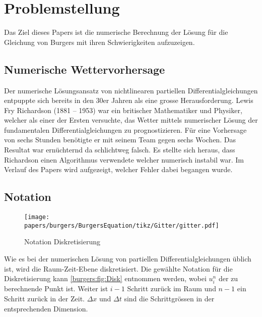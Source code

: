 %
%
\section{Problemstellung
\label{burgers:section:problemstellung}}

	Das Ziel dieses Papers ist die numerische Berechnung der Lösung für die Gleichung von Burgers mit ihren Schwierigkeiten aufzuzeigen.



	\subsection{Numerische Wettervorhersage}
	\label{burgers:sec:nwp}

	Der numerische L\"osungsansatz von nichtlinearen partiellen Differentialgleichungen entpuppte sich bereits in den 30er Jahren als eine grosse Herausforderung.
	Lewis Fry Richardson (1881 -- 1953) war ein britischer Mathematiker und Physiker, welcher als einer der Ersten versuchte, das Wetter mittels numerischer Lösung der fundamentalen Differentialgleichungen zu prognostizieren.
%
	F\"ur eine Vorhersage von sechs Stunden ben\"otigte er mit seinem Team gegen sechs Wochen.
%
	Das Resultat war ern\"uchternd da schlichtweg falsch.
	Es stellte sich heraus, dass Richardson einen Algorithmus verwendete welcher numerisch instabil war.
	Im Verlauf des Papers wird aufgezeigt, welcher Fehler dabei begangen wurde.

	\subsection{Notation}

     \begin{figure}
       \centering
       \texttt{[image: papers/burgers/BurgersEquation/tikz/Gitter/gitter.pdf]}
       \caption{Notation Diskretisierung}
       \label{burgers:fig:Disk}
     \end{figure}


     Wie es bei der numerischen L\"osung von partiellen Differentialgleichungen \"ublich ist, wird die Raum-Zeit-Ebene  diskretisiert.
     Die gew\"ahlte Notation f\"ur die Diskretisierung kann \autoref{burgers:fig:Disk} entnommen werden, wobei $u_i^n$ der zu berechnende Punkt ist.
%
     Weiter ist $i-1$ Schritt zur\"uck im Raum und $n-1$ ein Schritt zur\"uck in der Zeit.
     $\Delta x$ und $\Delta t$ sind die Schrittgr\"ossen in der entsprechenden Dimension.
